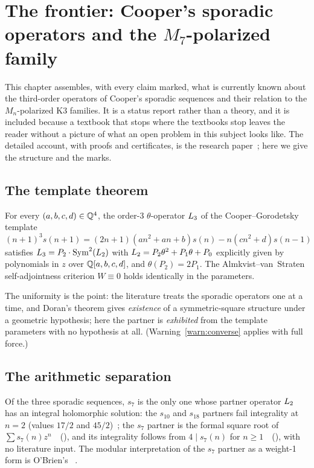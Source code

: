 \chapter{The frontier: Cooper's sporadic operators and the \texorpdfstring{$M_7$}{M7}-polarized family}\label{ch:frontier}

This chapter assembles, with every claim marked, what is currently known about
the third-order operators of Cooper's sporadic sequences and their relation to
the $M_n$-polarized K3 families. It is a status report rather than a theory,
and it is included because a textbook that stops where the textbooks stop
leaves the reader without a picture of what an open problem in this subject
looks like. The detailed account, with proofs and certificates, is the
research paper~\cite{Callens2026paper}; here we give the structure and the
marks.

\section{The template theorem}

\begin{theorem}\label{thm:template}
For every $(a,b,c,d)\in\mathbb{Q}^4$, the order-3 $\theta$-operator $L_3$ of the
Cooper--Gorodetsky template
\[
  (n+1)^3s(n+1)=(2n+1)(an^2+an+b)s(n)-n(cn^2+d)s(n-1)
\]
satisfies $L_3=P_2\cdot\operatorname{Sym}^2(L_2)$ with
$L_2=P_2\theta^2+P_1\theta+P_0$ explicitly given by polynomials in $z$ over
$\mathbb{Q}[a,b,c,d]$, and $\theta(P_2)=2P_1$. The Almkvist--van~Straten self-adjointness
criterion $W\equiv0$ holds identically in the parameters.
\end{theorem}

The uniformity is the point: the literature treats the sporadic operators one
at a time, and Doran's theorem gives \emph{existence} of a symmetric-square
structure under a geometric hypothesis; here the partner is \emph{exhibited}
from the template parameters with no hypothesis at all.
(Warning~\ref{warn:converse} applies with full force.)

\section{The arithmetic separation}

\begin{theorem}\label{thm:separation}
Of the three sporadic sequences, $s_7$ is the only one whose partner operator
$L_2$ has an integral holomorphic solution: the $s_{10}$ and $s_{18}$
partners fail integrality at $n=2$ (values $17/2$ and $45/2$)~\Kstatus; the
$s_7$ partner is the formal square root of $\sum s_7(n)z^n$~\Kstatus\
(), and its integrality follows from
$4\mid s_7(n)$ for $n\ge1$~\Kstatus\ (\artifact{four\_dvd\_s7}), with no
literature input. The modular interpretation of the $s_7$ partner as a weight-1
form is O'Brien's~\cite{OBrien2016} \Lstatus.
\end{theorem}

